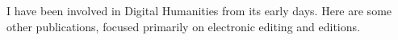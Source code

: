 \begin{refsection}
    \nocite{steven_e._jones_codename_2012,dh2011_jones_thiruvathukal}
    \printbibliography[heading=none]
\end{refsection}

I have been involved in Digital Humanities from its early days. Here are some other publications, focused primarily on electronic editing and editions.

\begin{refsection}
    \nocite{george_k._thiruvathukal_electronic_2006, dh2014_borg_thiruvathukal}
    \printbibliography[heading=none]
\end{refsection}

